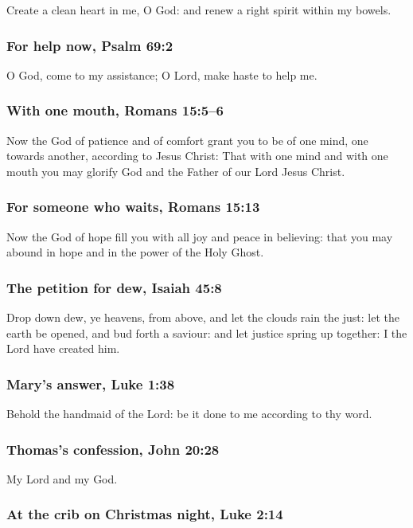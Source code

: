 Create a clean heart in me, O God: and renew a right spirit within my bowels.

\subsubsection*{For help now, Psalm 69:2}

O God, come to my assistance; O Lord, make haste to help me.

\subsubsection*{With one mouth, Romans 15:5--6}

Now the God of patience and of comfort grant you to be of one mind, one towards another, according to Jesus Christ: That with one mind and with one mouth you may glorify God and the Father of our Lord Jesus Christ.

\subsubsection*{For someone who waits, Romans 15:13}

Now the God of hope fill you with all joy and peace in believing: that you may abound in hope and in the power of the Holy Ghost.

\subsubsection*{The petition for dew, Isaiah 45:8}

Drop down dew, ye heavens, from above, and let the clouds rain the just: let the earth be opened, and bud forth a saviour: and let justice spring up together: I the Lord have created him.

\subsubsection*{Mary's answer, Luke 1:38}

Behold the handmaid of the Lord: be it done to me according to thy word.

\subsubsection*{Thomas's confession, John 20:28}

My Lord and my God.

\subsubsection*{At the crib on Christmas night, Luke 2:14}

